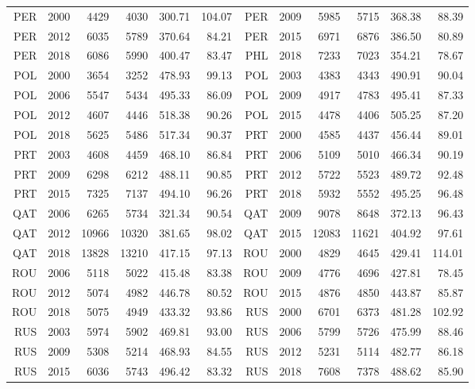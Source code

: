 {\begin{longtable}{r|r|r|r|r|r||r|r|r|r|r|r}
    PER   & 2000  & 4429  & 4030  & 300.71 & 104.07 & PER   & 2009  & 5985  & 5715  & 368.38 & 88.39 \\
    PER   & 2012  & 6035  & 5789  & 370.64 & 84.21 & PER   & 2015  & 6971  & 6876  & 386.50 & 80.89 \\
    PER   & 2018  & 6086  & 5990  & 400.47 & 83.47 & PHL   & 2018  & 7233  & 7023  & 354.21 & 78.67 \\
    POL   & 2000  & 3654  & 3252  & 478.93 & 99.13 & POL   & 2003  & 4383  & 4343  & 490.91 & 90.04 \\
    POL   & 2006  & 5547  & 5434  & 495.33 & 86.09 & POL   & 2009  & 4917  & 4783  & 495.41 & 87.33 \\
    POL   & 2012  & 4607  & 4446  & 518.38 & 90.26 & POL   & 2015  & 4478  & 4406  & 505.25 & 87.20 \\
    POL   & 2018  & 5625  & 5486  & 517.34 & 90.37 & PRT   & 2000  & 4585  & 4437  & 456.44 & 89.01 \\
    PRT   & 2003  & 4608  & 4459  & 468.10 & 86.84 & PRT   & 2006  & 5109  & 5010  & 466.34 & 90.19 \\
    PRT   & 2009  & 6298  & 6212  & 488.11 & 90.85 & PRT   & 2012  & 5722  & 5523  & 489.72 & 92.48 \\
    PRT   & 2015  & 7325  & 7137  & 494.10 & 96.26 & PRT   & 2018  & 5932  & 5552  & 495.25 & 96.48 \\
    QAT   & 2006  & 6265  & 5734  & 321.34 & 90.54 & QAT   & 2009  & 9078  & 8648  & 372.13 & 96.43 \\
    QAT   & 2012  & 10966 & 10320 & 381.65 & 98.02 & QAT   & 2015  & 12083 & 11621 & 404.92 & 97.61 \\
    QAT   & 2018  & 13828 & 13210 & 417.15 & 97.13 & ROU   & 2000  & 4829  & 4645  & 429.41 & 114.01 \\
    ROU   & 2006  & 5118  & 5022  & 415.48 & 83.38 & ROU   & 2009  & 4776  & 4696  & 427.81 & 78.45 \\
    ROU   & 2012  & 5074  & 4982  & 446.78 & 80.52 & ROU   & 2015  & 4876  & 4850  & 443.87 & 85.87 \\
    ROU   & 2018  & 5075  & 4949  & 433.32 & 93.86 & RUS   & 2000  & 6701  & 6373  & 481.28 & 102.92 \\
    RUS   & 2003  & 5974  & 5902  & 469.81 & 93.00 & RUS   & 2006  & 5799  & 5726  & 475.99 & 88.46 \\
    RUS   & 2009  & 5308  & 5214  & 468.93 & 84.55 & RUS   & 2012  & 5231  & 5114  & 482.77 & 86.18 \\
    RUS   & 2015  & 6036  & 5743  & 496.42 & 83.32 & RUS   & 2018  & 7608  & 7378  & 488.62 & 85.90 \\

\end{longtable}}
